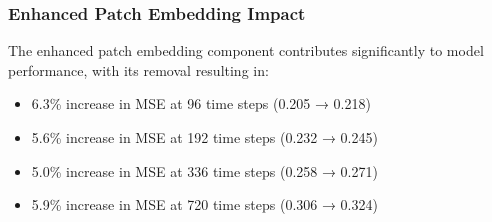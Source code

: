 \documentclass[12pt]{uomthesis}
\begin{document}
\begin{table}[ht]
\centering
\caption{Ablation study showing the impact of individual PatchXFormer components on forecasting performance (MSE values)}
\label{tab:ablation_components}
\end{table}

\subsubsection{Enhanced Patch Embedding Impact}

The enhanced patch embedding component contributes significantly to model performance, with its removal resulting in:
\begin{itemize}
\item 6.3\% increase in MSE at 96 time steps (0.205 → 0.218)
\item 5.6\% increase in MSE at 192 time steps (0.232 → 0.245)
\item 5.0\% increase in MSE at 336 time steps (0.258 → 0.271)
\item 5.9\% increase in MSE at 720 time steps (0.306 → 0.324)
\end{itemize}
\end{document}

